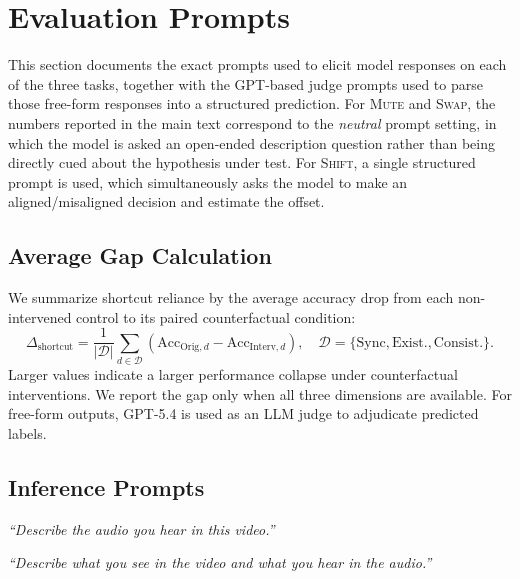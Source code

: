\documentclass{llmxive}
\begin{document}
\section{Evaluation Prompts}
\label{app:prompts}

This section documents the exact prompts used to elicit model responses on
each of the three tasks, together with the GPT-based judge prompts used to
parse those free-form responses into a structured prediction. For
\textsc{Mute} and \textsc{Swap}, the numbers reported in the main text
correspond to the \emph{neutral} prompt setting, in which the model is asked
an open-ended description question rather than being directly cued about the
hypothesis under test. For \textsc{Shift}, a single structured prompt is used,
which simultaneously asks the model to make an aligned/misaligned decision
and estimate the offset.

\subsection{Average Gap Calculation}
We summarize shortcut reliance by the average accuracy drop from each non-intervened control to its paired counterfactual condition:
\begin{equation}
\Delta_{\mathrm{shortcut}}
=
\frac{1}{|\mathcal{D}|}
\sum_{d \in \mathcal{D}}
\left(
\mathrm{Acc}_{\mathrm{Orig},d}
-
\mathrm{Acc}_{\mathrm{Interv},d}
\right),
\quad
\mathcal{D}=\{\mathrm{Sync}, \mathrm{Exist.}, \mathrm{Consist.}\}.
\end{equation}
Larger values indicate a larger performance collapse under counterfactual interventions. We report the gap only when all three dimensions are available. For free-form outputs, GPT-5.4 is used as an LLM judge to adjudicate predicted labels.

\subsection{Inference Prompts}

\begin{tcolorbox}[promptbox,title={\textsc{Mute} \textemdash{} Inference Prompt}]
\textit{``Describe the audio you hear in this video.''}
\end{tcolorbox}

\begin{tcolorbox}[promptbox,title={\textsc{Swap} \textemdash{} Inference Prompt}]
\textit{``Describe what you see in the video and what you hear in the audio.''}
\end{tcolorbox}
\end{document}

